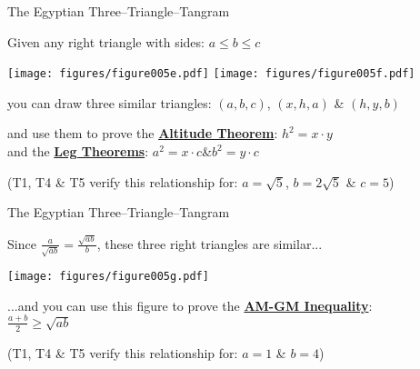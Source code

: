 \documentclass[14pt]{beamer}
\begin{document}
    \begin{frame}{The Egyptian Three--Triangle--Tangram}
        \begin{center}
            Given any right triangle with sides: {\small $a \leq b \leq c$}

            \bigskip\bigskip

            \texttt{[image: figures/figure005e.pdf]}\quad
            \texttt{[image: figures/figure005f.pdf]}

            \bigskip

            {\small you can draw three similar triangles: {\footnotesize $(a,b,c)$,\; $(x,h,a)$\; \&\; $(h,y,b)$}\\\bigskip

            and use them to prove the \textbf{\href{https://en.wikipedia.org/wiki/Geometric_mean_theorem}{Altitude Theorem}}: {\footnotesize $h^{2} = x\cdot y$}\\and the \textbf{\href{https://en.wikipedia.org/wiki/Right_triangle\#Altitudes}{Leg Theorems}}: {\footnotesize$a^{2} = x\cdot c$\quad \&\quad $b^{2} = y\cdot c$}}

            \bigskip

            {\footnotesize (T1, T4 \& T5 verify this relationship for: $a=\sqrt{5}$,\; $b=2\sqrt{5}$\; \&\; $c=5$)}
        \end{center}
    \end{frame}


    \begin{frame}{The Egyptian Three--Triangle--Tangram}
        \begin{center}
            Since {\small $\frac{a}{\sqrt{\!ab}} = \tfrac{\sqrt{\!ab}}{b}$}, these three right triangles are similar...

            \medskip

            \texttt{[image: figures/figure005g.pdf]}

            \bigskip

            {\small ...and you can use this figure to prove the \textbf{\href{https://en.wikipedia.org/wiki/Inequality_of_arithmetic_and_geometric_means}{AM-GM Inequality}}:\\\medskip$\displaystyle\frac{a+b}{2} \geq \sqrt{\!ab}$}\\

            \bigskip

            {\footnotesize (T1, T4 \& T5 verify this relationship for: $a=1$\; \&\; $b=4$)}
        \end{center}
    \end{frame}
\end{document}
